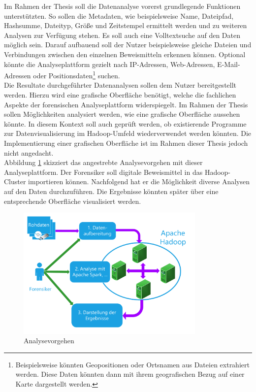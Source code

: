 \noindent
Im Rahmen der Thesis soll die Datenanalyse vorerst grundlegende Funktionen unterstützten.
So sollen die Metadaten, wie beispielsweise Name, Dateipfad, Hashsumme, Dateityp, Größe und Zeitstempel ermittelt werden und zu weiteren Analysen zur Verfügung stehen.
Es soll auch eine Volltextsuche auf den Daten möglich sein. Darauf aufbauend soll der Nutzer beispielsweise gleiche Dateien und Verbindungen zwischen den einzelnen Beweismitteln erkennen können.
Optional könnte die Analyseplattform gezielt nach IP-Adressen, Web-Adressen, E-Mail-Adressen oder Positionsdaten\footnote{Beispielsweise könnten Geopositionen oder Ortsnamen aus Dateien extrahiert werden. Diese Daten könnten dann mit ihrem geografischen Bezug auf einer Karte dargestellt werden.} suchen.\\

\noindent
Die Resultate durchgeführter Datenanalysen sollen dem Nutzer bereitgestellt werden. Hierzu
wird eine grafische Oberfläche benötigt, welche die fachlichen Aspekte der forensischen Analyseplattform widerspiegelt. Im Rahmen der Thesis sollen Möglichkeiten analysiert werden, wie eine grafische Oberfläche aussehen könnte. In diesem Kontext soll auch geprüft werden, ob existierende Programme zur Datenvisualisierung im Hadoop-Umfeld wiederverwendet werden könnten. Die Implementierung einer grafischen Oberfläche ist im Rahmen dieser Thesis jedoch nicht angedacht.\\

\noindent
Abbildung \ref{fig:foam_analysis_approach} skizziert das angestrebte Analysevorgehen mit dieser Analyseplattform. Der Forensiker soll digitale Beweismittel in das Hadoop-Cluster importieren können. Nachfolgend hat er die Möglichkeit diverse Analysen auf den Daten durchzuführen. Die Ergebnisse könnten später über eine entsprechende Oberfläche visualisiert werden.\\

\begin{figure}[ht]
  \centering
  \includegraphics[width=0.82\textwidth]{./resource/Hadoop-Struktur.pdf}
  \caption{Analysevorgehen}
  \label{fig:foam_analysis_approach}
\end{figure}

